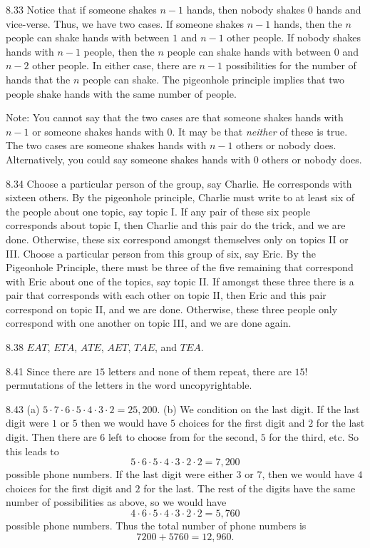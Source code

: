 \begin{Answer}{8.33}
Notice that if someone shakes $n-1$ hands, then nobody shakes $0$ hands and vice-verse.
Thus, we have two cases.
If someone shakes $n-1$ hands, then the $n$ people can shake
hands with between $1$ and $n-1$ other people.
If nobody shakes hands with $n-1$ people, then the $n$ people can shake
hands with between $0$ and $n-2$ other people. In either case, there are $n-1$
possibilities for the number of hands that the $n$ people can shake.
The pigeonhole principle implies that two people shake hands with the same number of people.

Note:  You cannot say that the two cases are that someone shakes hands with $n-1$ or
someone shakes hands with $0$. It may be that {\em neither} of these is true.
The two cases are someone shakes hands with $n-1$ others or nobody does.  Alternatively,
you could say someone shakes hands with $0$ others or nobody does.
\end{Answer}
\begin{Answer}{8.34}
Choose a particular person of the group, say Charlie. He
corresponds with sixteen others. By the pigeonhole principle,
Charlie must write to at least six of the people about one topic, say
topic I. If any pair of these six people corresponds about topic I,
then Charlie and this pair do the trick, and we are done.
Otherwise, these six correspond amongst themselves only on topics
II or III. Choose a particular person from this group of six, say
Eric. By the Pigeonhole Principle, there must be three of the five
remaining that correspond with Eric about one of the topics, say
topic II. If amongst these three there is a pair that corresponds
with each other on topic II, then Eric and this pair correspond on
topic II, and we are done. Otherwise, these three people only
correspond with one another on topic III, and we are done again.
\end{Answer}
\begin{Answer}{8.38}
$EAT$, $ETA$, $ATE$, $AET$, $TAE$, and $TEA$.
\end{Answer}
\begin{Answer}{8.41}
Since there are $15$ letters and none of them repeat, there are $15!$ permutations
of the letters in the word {\sc uncopyrightable}.
\end{Answer}
\begin{Answer}{8.43}
(a) $5\cdot 7\cdot 6 \cdot 5 \cdot 4 \cdot 3 \cdot 2 = 25,200$.
(b) We condition on the last digit.
If the last digit were $1$ or $5$ then we would have $5$
choices for the first digit and $2$ for the last digit.
Then there are $6$ left to choose from for the second, $5$ for the third, etc.
So this leads to
$$5\cdot 6 \cdot 5\cdot 4 \cdot 3\cdot 2 \cdot 2 = 7,200$$
possible phone numbers.
If the last digit were either $3$ or $7$, then
we would have $4$ choices for the first digit and $2$ for the last.
The rest of the digits have the same number of possibilities as above, so we would
have
$$4\cdot 6\cdot 5 \cdot 4 \cdot 3\cdot 2 \cdot 2  = 5,760   $$
possible phone numbers. Thus the total number of phone numbers is
$$7200 + 5760 = 12,960.$$
\end{Answer}
